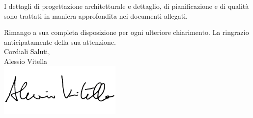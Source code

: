 \documentclass[12pt,a4paper]{article}
\newcommand{\AVI}{Alessio Vitella}
\begin{document}
\newpage

I dettagli di progettazione architetturale e dettaglio, di pianificazione e di qualità sono trattati in maniera approfondita nei documenti allegati.

Rimango a sua completa disposizione per ogni ulteriore chiarimento. La ringrazio anticipatamente della sua attenzione.\\

Cordiali Saluti,\\
\AVI \\
\includegraphics[width=6cm]{../img/firmaVitella.png}
\end{document}
